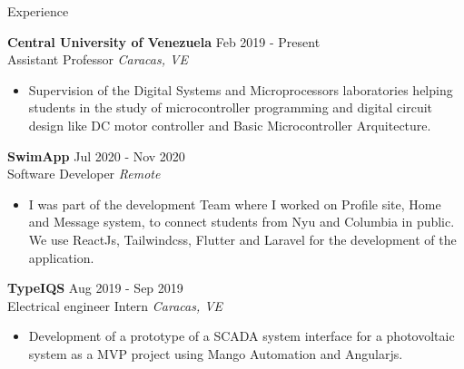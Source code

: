 \documentclass{resume} %
\begin{document}
\begin{rSection}{Experience} %

    \textbf{Central University of Venezuela} \hfill Feb 2019 - Present\\
    Assistant Professor \hfill \textit{Caracas, VE}
    \begin{itemize}

        \item Supervision of the Digital Systems and Microprocessors 
        laboratories helping students in the study of microcontroller 
        programming and digital circuit design like DC motor controller and 
        Basic Microcontroller Arquitecture. 

    \end{itemize}


    \textbf{SwimApp} \hfill Jul 2020 - Nov 2020\\
    Software Developer \hfill \textit{Remote}
    \begin{itemize}

        \item I was part of the development Team where I worked on Profile site,
        Home and Message system, to connect students from Nyu and Columbia in 
        public. We use ReactJs, Tailwindcss, Flutter and Laravel for the 
        development of the application.

    \end{itemize}

    \textbf{TypeIQS} \hfill Aug 2019 - Sep 2019\\
    Electrical engineer Intern \hfill \textit{Caracas, VE}
    \begin{itemize}

        \item Development of a prototype of a SCADA system interface for a 
        photovoltaic system as a MVP project using Mango Automation and 
        Angularjs.

    \end{itemize}


\end{rSection}
\end{document}
